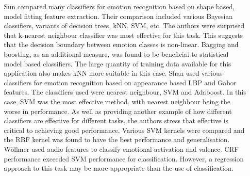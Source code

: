 Sun \etal \cite{Sun2004} compared many classifiers for emotion recognition based on shape based, model fitting feature extraction. Their comparison included various Bayesian classifiers, variants of decision trees, \ac{kNN}, \ac{SVM}, etc. The authors were surprised that k-nearest neighbour classifier was most effective for this task. This suggests that the decision boundary between emotion classes is non-linear. Bagging and boosting, as an additional measure, was found to be beneficial to statistical model based classifiers. The large quantity of training data available for this application also makes \ac{kNN} more suitable in this case. Shan \etal \cite{Shan2009} used various classifiers for emotion recognition based on appearance based \ac{LBP} and Gabor features. The classifiers used were nearest neighbour, \ac{SVM} and Adaboost. In this case, \ac{SVM} was the most effective method, with nearest neighbour being the worse in performance. As well as providing another example of how different classifiers are effective for different tasks, the authors stress that effective \featureGeneration is critical to achieving good performance. Various \ac{SVM} kernels were compared and the \ac{RBF} kernel was found to have the best performance and generalisation. W\"{o}llmer \etal \cite{Wollmer2008} used audio features to classify emotional activation and valence. \ac{CRF} performance exceeded \ac{SVM} performance for classification. However, a regression approach to this task may be more appropriate than the use of classification.

